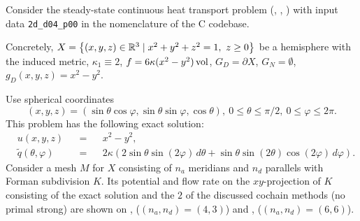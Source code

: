 \begin{example}
  \label{idec/diffusion/continuous/steady_state/examples/2d_d04_p00-example}
  Consider the steady-state continuous heat transport problem
  (,
   ,
   )
  with input data \verb|2d_d04_p00| in the nomenclature of the C codebase.

  Concretely,
    $X = \left\{ (x, y, z) \in \mathbb{R}^3 \mid x^2 + y^2 + z^2 = 1,\ z \geq 0 \right\}$ be a
      hemisphere with the induced metric,
    $\kappa_1 \equiv 2$,
    $f = 6 \kappa (x^2 - y^2) \mathop{\rm vol}\nolimits$,
    $G_D = \partial X$,
    $G_N = \emptyset$,
    $g_D(x, y, z) = x^2 - y^2$.

  Use spherical coordinates
  \begin{equation}
    (x, y, z)
    = (\sin \theta \cos \varphi, \sin \theta \sin \varphi, \cos \theta),\
    0 \leq \theta \leq \pi / 2,\
    0 \leq \varphi \leq 2 \pi.
  \end{equation}
  This problem has the following exact solution:
  \begin{subequations}
    \begin{alignat}{3}
      & u(x, y, z) && = && x^2 - y^2, \\
      & \tilde{q}(\theta, \varphi) &&
      = && 2 \kappa (2 \sin \theta \sin(2 \varphi)\, d \theta
                     + \sin \theta \sin(2 \theta) \cos (2 \varphi)\, d \varphi).
    \end{alignat}
  \end{subequations}
  Consider a mesh $M$ for $X$ consisting of $n_a$ meridians and $n_d$ parallels
  with Forman subdivision $K$.
  Its potential and flow rate on the $xy$-projection of $K$ consisting of the
  exact solution and the $2$ of the discussed cochain methods (no primal strong)
  are shown on
  ,
  ($(n_a, n_d) = (4, 3)$)
  and
  ,
  ($(n_a, n_d) = (6, 6)$).
\end{example}
